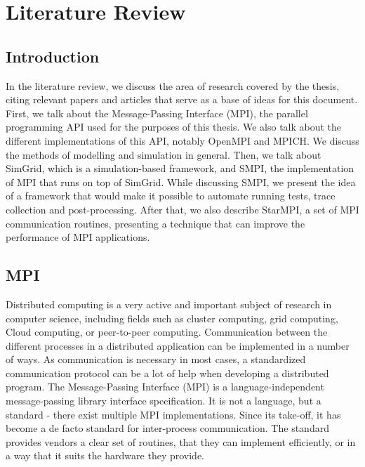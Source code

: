 
\chapter{Literature Review}
\label{Chapter2}

\section{Introduction}
In the literature review, we discuss the area of research covered by
the thesis, citing relevant papers and articles that serve as a base
of ideas for this document.\\
First, we talk about the Message-Passing Interface (MPI), the parallel
programming API used for the purposes of this thesis. We also talk
about the different implementations of this API, notably OpenMPI and
MPICH. We discuss the methods of modelling and simulation in general.
Then, we talk about SimGrid, which is a simulation-based
framework, and SMPI, the implementation of MPI that runs on top of
SimGrid. While discussing SMPI, we present the idea of a framework
that would make it possible to automate running tests, trace
collection and post-processing. After that, we also describe StarMPI,
a set of MPI communication routines, presenting a technique that can
improve the performance of MPI applications.
\section{MPI}
Distributed computing is a very active and important subject of research
in computer science, including fields such as cluster computing, grid
computing, Cloud computing, or peer-to-peer computing. Communication
between the different processes in a distributed application can be
implemented in a number of ways. As communication is necessary in most
cases, a standardized communication protocol can be a lot of help when
developing a distributed program. The Message-Passing Interface (MPI)
is a language-independent message-passing library
interface specification. It is not a language, but a standard - there
exist multiple MPI implementations. Since its take-off, it has become
a de facto standard for inter-process communication. The standard
provides vendors a clear set of routines, that they can implement
efficiently, or in a way that it suits the hardware they
provide.\cite{mpif12}
